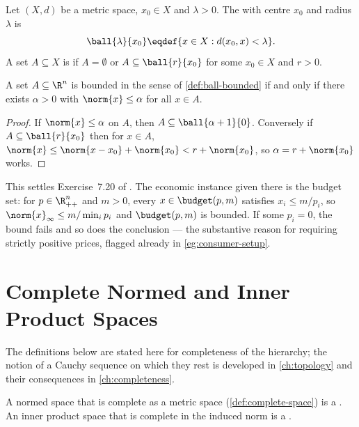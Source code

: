 \begin{definition}\label{def:ball-bounded}
	Let $(X,d)$ be a metric space, $x_0\in X$ and $\lambda>0$. The 
	with centre $x_0$ and radius $\lambda$ is
	\[
		\ball{\lambda}{x_0}\eqdef\{x\in X : d(x_0,x)<\lambda\}.
	\]
	A set $A\subseteq X$ is  if $A=\emptyset$ or $A\subseteq
		\ball{r}{x_0}$ for some $x_0\in X$ and $r>0$.
\end{definition}

\begin{proposition}\label{prop:bounded-equiv}
	A set $A\subseteq\R^n$ is bounded in the sense of \autoref{def:ball-bounded} if
	and only if there exists $\alpha>0$ with $\norm{x}\leq\alpha$ for all $x\in A$.
\end{proposition}

\begin{proof}
	If $\norm{x}\leq\alpha$ on $A$, then $A\subseteq\ball{\alpha+1}{0}$. Conversely
	if $A\subseteq\ball{r}{x_0}$ then for $x\in A$,
	$\norm{x}\leq\norm{x-x_0}+\norm{x_0}<r+\norm{x_0}$, so
	$\alpha=r+\norm{x_0}$ works.
\end{proof}

This settles Exercise~7.20 of \autocite[slide 28]{fukuda2026analysis}. The
economic instance given there is the budget set: for $p\in\R^n_{++}$ and $m>0$,
every $x\in\budget(p,m)$ satisfies $x_i\leq m/p_i$, so
$\norm{x}_\infty\leq m/\min_ip_i$ and $\budget(p,m)$ is bounded. If some
$p_i=0$, the bound fails and so does the conclusion --- the substantive reason
for requiring strictly positive prices, flagged already in
\autoref{eg:consumer-setup}.

\section{Complete Normed and Inner Product Spaces}\label{sec:met-banach}

The definitions below are stated here for completeness of the hierarchy; the
notion of a Cauchy sequence on which they rest is developed in
\autoref{ch:topology} and their consequences in \autoref{ch:completeness}.

\begin{definition}\label{def:banach-hilbert}
	A normed space that is complete as a metric space
	(\autoref{def:complete-space}) is a . An inner product space
	that is complete in the induced norm is a .
\end{definition}

